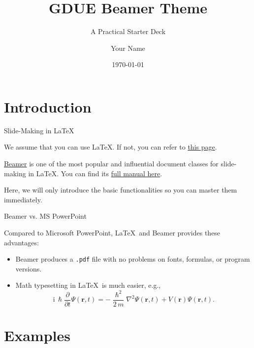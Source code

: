 \documentclass[10pt,aspectratio=169]{beamer}
\title{GDUE Beamer Theme}
\subtitle{A Practical Starter Deck}
\author{Your Name}
\institute{Guangdong University of Education}
\date{\today}
\begin{document}
\maketitle %

\section{Introduction}

\begin{frame}{Slide-Making in \LaTeX}

	We assume that you can use \LaTeX. If not, you can refer to \href{https://www.overleaf.com/learn/latex/Learn_LaTeX_in_30_minutes}{this page}.

	\href{https://www.overleaf.com/learn/latex/Beamer}{Beamer} is one of the most popular and influential document classes for slide-making in \LaTeX. You can find its \href{https://mirror-hk.koddos.net/CTAN/macros/latex/contrib/beamer/doc/beameruserguide.pdf}{full manual here}.

	Here, we will only introduce the basic functionalities so you can master them immediately.
\end{frame}


\begin{frame}{Beamer vs. MS PowerPoint}

	Compared to Microsoft PowerPoint, \LaTeX\ and Beamer provides\cite{lamport1994latex} these advantages:

\begin{itemize}
  \item Beamer produces a \texttt{.pdf} file with no problems\cite{goossens1997latex} on fonts, formulas, or program versions.
  \item Math typesetting in \LaTeX\ is much easier, e.g.,
			\begin{equation*}
				\mathrm{i}\,\hslash\frac{\partial}{\partial t} \Psi(\mathbf{r},t) =
				-\frac{\hslash^2}{2\,m}\nabla^2\Psi(\mathbf{r},t)
				+ V(\mathbf{r})\Psi(\mathbf{r},t).
			\end{equation*}
\end{itemize}
\end{frame}

\section{Examples}
\end{document}
